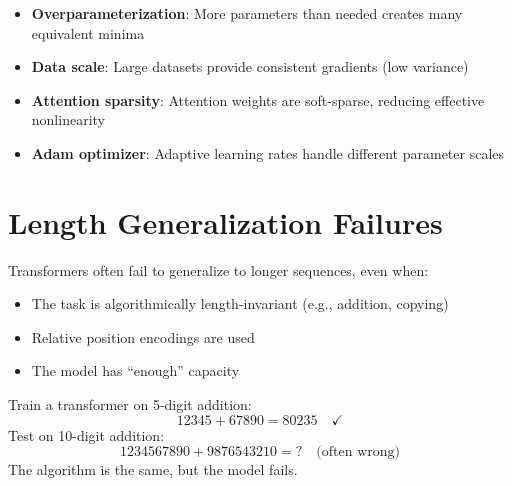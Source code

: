 \begin{remark}
    \begin{itemize}
        \item \textbf{Overparameterization}: More parameters than needed creates many equivalent minima
        \item \textbf{Data scale}: Large datasets provide consistent gradients (low variance)
        \item \textbf{Attention sparsity}: Attention weights are soft-sparse, reducing effective nonlinearity
        \item \textbf{Adam optimizer}: Adaptive learning rates handle different parameter scales
    \end{itemize}
\end{remark}

\section{Length Generalization Failures}

\begin{remark}
    Transformers often fail to generalize to longer sequences, even when:
    \begin{itemize}
        \item The task is algorithmically length-invariant (e.g., addition, copying)
        \item Relative position encodings are used
        \item The model has ``enough'' capacity
    \end{itemize}
\end{remark}

\begin{example}
    Train a transformer on 5-digit addition:
    \[
        12345 + 67890 = 80235 \quad \checkmark
    \]
    Test on 10-digit addition:
    \[
        1234567890 + 9876543210 = ? \quad \text{(often wrong)}
    \]
    The algorithm is the same, but the model fails.
\end{example}

